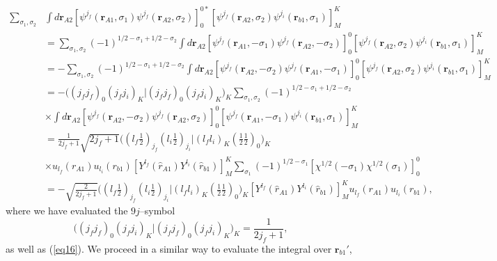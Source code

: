 \begin{equation}\label{eq18}
 \begin{split}
\sum_{\sigma_1, \sigma_2} &\int d\mathbf{r}_{A2} \left[ \psi ^{j_f} (\mathbf{r}_{A1},\sigma_1) \psi ^{j_f} (\mathbf{r}_{A2},\sigma_2) \right] _0^{0*} \left[ \psi ^{j_f} (\mathbf{r}_{A2},\sigma_2) \psi ^{j_i} (\mathbf{r}_{b1},\sigma_1) \right] _M^{K}\\
&=\sum_{\sigma_1, \sigma_2} (-1)^{1/2-\sigma_1+1/2-\sigma_2}\int d\mathbf{r}_{A2} \left[ \psi ^{j_f} (\mathbf{r}_{A1},-\sigma_1) \psi ^{j_f} (\mathbf{r}_{A2},-\sigma_2) \right] _0^{0} \left[ \psi ^{j_f} (\mathbf{r}_{A2},\sigma_2) \psi ^{j_i} (\mathbf{r}_{b1},\sigma_1) \right] _M^{K}\\
&=-\sum_{\sigma_1, \sigma_2} (-1)^{1/2-\sigma_1+1/2-\sigma_2}\int d\mathbf{r}_{A2} \left[ \psi ^{j_f} (\mathbf{r}_{A2},-\sigma_2) \psi ^{j_f} (\mathbf{r}_{A1},-\sigma_1) \right] _0^{0} \left[ \psi ^{j_f} (\mathbf{r}_{A2},\sigma_2) \psi ^{j_i} (\mathbf{r}_{b1},\sigma_1) \right] _M^{K}\\
&=-\bigl ( (j_f j_f)_0 (j_f j_i)_K |(j_f j_f)_0 (j_f j_i)_K \bigr )_K \sum_{\sigma_1, \sigma_2} (-1)^{1/2-\sigma_1+1/2-\sigma_2}\\
&\times \int d\mathbf{r}_{A2} \left[ \psi ^{j_f} (\mathbf{r}_{A2},-\sigma_2) \psi ^{j_f} (\mathbf{r}_{A2},\sigma_2) \right] _0^{0} \left[ \psi ^{j_f} (\mathbf{r}_{A1},-\sigma_1) \psi ^{j_i} (\mathbf{r}_{b1},\sigma_1) \right] _M^{K}\\
&=\frac{1}{2j_f+1}\sqrt{2j_f+1} \bigl ( (l_f \tfrac{1}{2})_{j_f} (l_i \tfrac{1}{2})_{j_i} |(l_f l_i)_K (\tfrac{1}{2} \tfrac{1}{2})_0 \bigr )_K \\
&\times u_{l_f}(r_{A1})u_{l_i}(r_{b1}) \left[ Y ^{l_f} (\hat r_{A1}) Y ^{l_i} (\hat r_{b1}) \right] _M^{K}
\sum_{\sigma_1}(-1)^{1/2-\sigma_1}\left[ \chi^{1/2} (-\sigma_1) \chi^{1/2} (\sigma_1) \right] _0^{0}\\
&=-\sqrt{\frac{2}{2j_f+1}} \bigl ( (l_f \tfrac{1}{2})_{j_f} (l_i \tfrac{1}{2})_{j_i} |(l_f l_i)_K (\tfrac{1}{2} \tfrac{1}{2})_0 \bigr )_K \left[ Y ^{l_f} (\hat r_{A1}) Y ^{l_i} (\hat r_{b1}) \right] _M^{K} u_{l_f}(r_{A1})u_{l_i}(r_{b1}),
 \end{split}
\end{equation}
where we have evaluated the $9j$--symbol
\begin{equation}\label{eq187}
    \bigl ( (j_f j_f)_0 (j_f j_i)_K |(j_f j_f)_0 (j_f j_i)_K \bigr )_K=\frac{1}{2j_f+1},
\end{equation}
as well as (\ref{eq16}).
We proceed in a similar way to evaluate the integral over $\mathbf{r}_{b1}'$,

